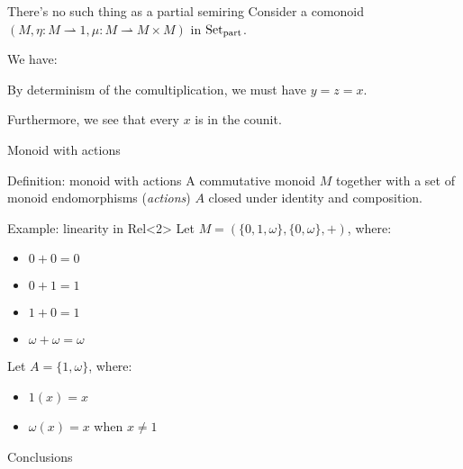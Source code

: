 \documentclass[fleqn]{beamer}
\newcommand\Rel{\mathrm{Rel}}
\begin{document}
\begin{frame}{There's no such thing as a partial semiring}
  Consider a comonoid
  $(M, \eta : M \rightharpoonup 1, \mu : M \rightharpoonup M \times M)$ in
  $\operatorname{Set}_{\mathrm{part}}$.

  We have:

  By determinism of the comultiplication, we must have $y = z = x$.

  Furthermore, we see that every $x$ is in the counit.
\end{frame}

\begin{frame}{Monoid with actions}
  \begin{block}{Definition: monoid with actions}
    A commutative monoid $M$ together with a set of monoid endomorphisms
    (\emph{actions}) $A$ closed under identity and composition.
  \end{block}
  \begin{block}{Example: linearity in $\Rel$}<2>
    Let $M = (\{0,1,\omega\}, \{0,\omega\}, +)$, where:
    \begin{itemize}
      \item $0 + 0 = 0$
      \item $0 + 1 = 1$
      \item $1 + 0 = 1$
      \item $\omega + \omega = \omega$
    \end{itemize}
    Let $A = \{1, \omega\}$, where:
    \begin{itemize}
      \item $1(x) = x$
      \item $\omega(x) = x$ when $x \neq 1$
    \end{itemize}
  \end{block}
\end{frame}

\begin{frame}{Conclusions}
\end{frame}
\end{document}
